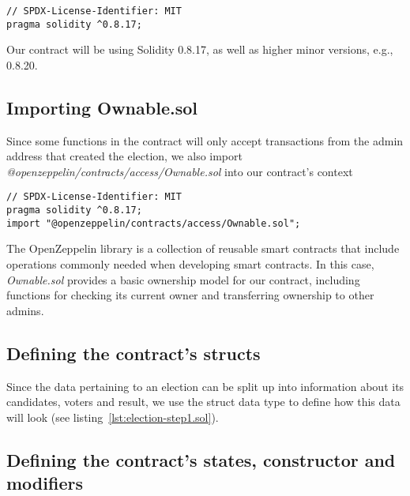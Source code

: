 \begin{verbatim}
// SPDX-License-Identifier: MIT
pragma solidity ^0.8.17;
\end{verbatim}

Our contract will be using Solidity 0.8.17, as well as higher minor versions, e.g., 0.8.20.

\subsection{Importing Ownable.sol}\label{subsec:impotring-ownable.sol}

Since some functions in the contract will only accept transactions from the admin address that created the election, we also import \emph{@openzeppelin/contracts/access/Ownable.sol} into our contract's context

\begin{verbatim}
// SPDX-License-Identifier: MIT
pragma solidity ^0.8.17;
import "@openzeppelin/contracts/access/Ownable.sol";
\end{verbatim}

The OpenZeppelin library is a collection of reusable smart contracts that include operations commonly needed when developing smart contracts.
In this case, \emph{Ownable.sol} provides a basic ownership model for our contract, including functions for checking its current owner and transferring ownership to other admins.

\subsection{Defining the contract's structs}\label{subsec:defining-the-contracts-structs}


Since the data pertaining to an election can be split up into information about its candidates, voters and result, we use the struct data type to define how this data will look (see listing~\ref{lst:election-step1.sol}).

\subsection{Defining the contract's states, constructor and modifiers}\label{subsec:defining-the-contract's-states-constructor-and-modifiers}

